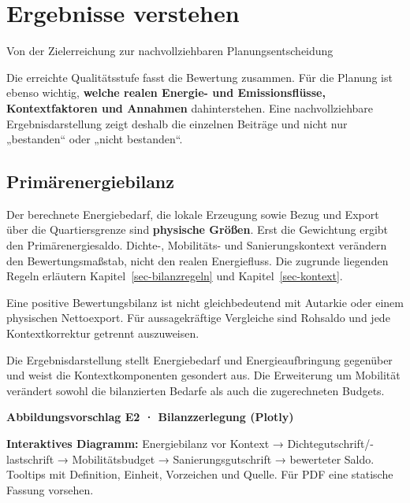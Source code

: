 \documentclass[
  ngerman,
  a4paper,
  DIV=11]{scrreprt}
\begin{document}
\chapter{Ergebnisse verstehen}\label{sec-ergebnisse}

Von der Zielerreichung zur nachvollziehbaren Planungsentscheidung

Die erreichte Qualitätsstufe fasst die Bewertung zusammen. Für die
Planung ist ebenso wichtig, \textbf{welche realen Energie- und
Emissionsflüsse, Kontextfaktoren und Annahmen} dahinterstehen. Eine
nachvollziehbare Ergebnisdarstellung zeigt deshalb die einzelnen
Beiträge und nicht nur „bestanden`` oder „nicht bestanden``.

\section{Primärenergiebilanz}\label{primuxe4renergiebilanz}

Der berechnete Energiebedarf, die lokale Erzeugung sowie Bezug und
Export über die Quartiersgrenze sind \textbf{physische Größen}. Erst die
Gewichtung ergibt den Primärenergiesaldo. Dichte-, Mobilitäts- und
Sanierungskontext verändern den Bewertungsmaßstab, nicht den realen
Energiefluss. Die zugrunde liegenden Regeln erläutern
Kapitel~\ref{sec-bilanzregeln} und Kapitel~\ref{sec-kontext}.

Eine positive Bewertungsbilanz ist nicht gleichbedeutend mit Autarkie
oder einem physischen Nettoexport. Für aussagekräftige Vergleiche sind
Rohsaldo und jede Kontextkorrektur getrennt auszuweisen.

Die Ergebnisdarstellung stellt Energiebedarf und Energieaufbringung
gegenüber und weist die Kontextkomponenten gesondert aus. Die
Erweiterung um Mobilität verändert sowohl die bilanzierten Bedarfe als
auch die zugerechneten Budgets.

\begin{tcolorbox}[enhanced jigsaw, arc=.35mm, bottomrule=.15mm, breakable, colback=white, colframe=quarto-callout-note-color-frame, left=2mm, leftrule=.75mm, opacityback=0, rightrule=.15mm, toprule=.15mm]

\vspace{-3mm}\textbf{Abbildungsvorschlag E2 · Bilanzzerlegung (Plotly)}\vspace{3mm}

\textbf{Interaktives Diagramm:} Energiebilanz vor Kontext →
Dichtegutschrift/-lastschrift → Mobilitätsbudget → Sanierungsgutschrift
→ bewerteter Saldo. Tooltips mit Definition, Einheit, Vorzeichen und
Quelle. Für PDF eine statische Fassung vorsehen.

\end{tcolorbox}
\end{document}
